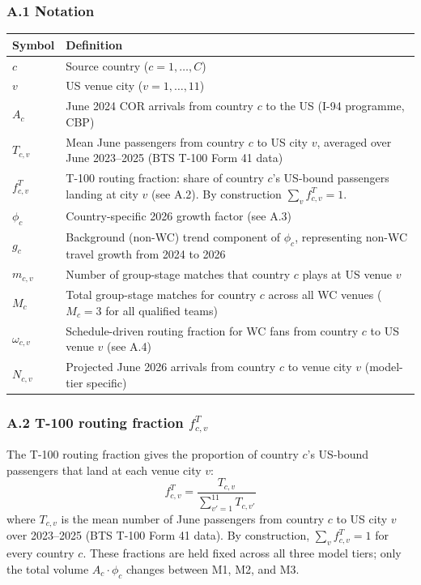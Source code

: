 \documentclass[12pt, a4paper]{article}
\begin{document}
\subsubsection*{A.1 Notation}

\begin{center}
\small
\begin{tabular}{p{2.2cm} p{10cm}}
\toprule
\textbf{Symbol} & \textbf{Definition} \\
\midrule
$c$ & Source country ($c = 1,\ldots,C$) \\
$v$ & US venue city ($v = 1,\ldots,11$) \\
$A_c$ & June 2024 COR arrivals from country $c$ to the US
        (I-94 programme, CBP) \\
$T_{c,v}$ & Mean June passengers from country $c$ to US city $v$,
        averaged over June 2023--2025 (BTS T-100 Form 41 data) \\
$f_{c,v}^{T}$ & T-100 routing fraction: share of country $c$'s
        US-bound passengers landing at city $v$ (see A.2).
        By construction $\sum_{v} f_{c,v}^{T} = 1$. \\
$\phi_c$ & Country-specific 2026 growth factor (see A.3) \\
$g_c$ & Background (non-WC) trend component of $\phi_c$,
        representing non-WC travel growth from 2024 to 2026 \\
$m_{c,v}$ & Number of group-stage matches that country $c$
        plays at US venue $v$ \\
$M_c$ & Total group-stage matches for country $c$ across all WC venues ($M_c = 3$ for all qualified teams) \\
$\omega_{c,v}$ & Schedule-driven routing fraction for WC fans
        from country $c$ to US venue $v$ (see A.4) \\
$N_{c,v}$ & Projected June 2026 arrivals from country $c$
        to venue city $v$ (model-tier specific) \\
\bottomrule
\end{tabular}
\end{center}

\subsubsection*{A.2 T-100 routing fraction $f_{c,v}^{T}$}

The T-100 routing fraction gives the proportion of country $c$'s
US-bound passengers that land at each venue city $v$:
\[
  f_{c,v}^{T} = \frac{T_{c,v}}{\displaystyle\sum_{v'=1}^{11} T_{c,v'}}
\]
where $T_{c,v}$ is the mean number of June passengers from country
$c$ to US city $v$ over 2023--2025 (BTS T-100 Form 41 data). By
construction, $\sum_{v} f_{c,v}^{T} = 1$ for every country $c$.
These fractions are held fixed across all three model tiers; only
the total volume $A_c \cdot \phi_c$ changes between M1, M2, and M3.
\end{document}
